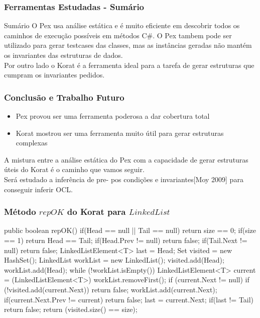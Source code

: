 \documentclass{beamer}
\begin{document}
\begin{frame}[fragile]\frametitle{Ferramentas Estudadas - Sumário}
\begin{block}{Sumário}
O Pex usa análise estática e é muito eficiente em descobrir todos os caminhos de execução possíveis em métodos C\#.
O Pex tambem pode ser utilizado para gerar testcases das classes, mas as instâncias geradas não mantém os invariantes das estruturas de dados.\\

Por outro lado o Korat é a ferramenta ideal para a tarefa de gerar estruturas que cumpram os invariantes pedidos.
\end{block}
\end{frame}

\begin{frame} \frametitle{Conclusão e Trabalho Futuro}
\begin{itemize}
\item Pex provou ser uma ferramenta poderosa a dar cobertura total
\item Korat mostrou ser uma ferramenta muito útil para gerar estruturas complexas
\end{itemize}
A mistura entre a análise estática do Pex com a capacidade de gerar estruturas úteis do Korat é o caminho que vamos seguir.\\

Será estudado a inferência de pre- pos condições e invariantes[Moy 2009] para conseguir inferir OCL.
\end{frame}

\begin{frame}[fragile] \frametitle{Método $repOK$ do Korat para $LinkedList$}
\begin{code}
public boolean repOK() {
  if(Head == null || Tail == null)
    return size == 0;
  if(size == 1) return Head == Tail;
  if(Head.Prev != null) return false;
  if(Tail.Next != null) return false;
  LinkedListElement<T> last = Head;
  Set visited = new HashSet();
  LinkedList workList = new LinkedList();
  visited.add(Head);
  workList.add(Head);
  while (!workList.isEmpty()) {
    LinkedListElement<T> current = (LinkedListElement<T>) workList.removeFirst();
    if (current.Next != null) {
      if (!visited.add(current.Next))
	    return false;
      workList.add(current.Next);
      if(current.Next.Prev != current) return false;
      last = current.Next;
    }
  }
  if(last != Tail)
    return false;
  return (visited.size() == size);
}
\end{code}
\end{frame}
\end{document}
